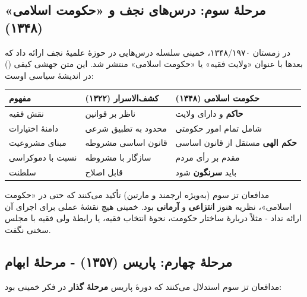 \documentclass[12pt,a4paper]{book}
\newcommand{\keyword}[1]{\textbf{\textcolor{cPrimary}{#1}}}
\newcommand{\en}[1]{\lr{\textit{#1}}}
\begin{document}
\subsection{مرحلهٔ سوم: درس‌های نجف و «حکومت اسلامی» (۱۳۴۸)}

در زمستان ۱۳۴۸/۱۹۷۰، خمینی سلسله درس‌هایی در حوزهٔ علمیهٔ نجف ارائه داد که بعدها با عنوان «ولایت فقیه» یا «حکومت اسلامی» منتشر شد. این متن جهشی کیفی (\en{qualitative leap}) در اندیشهٔ سیاسی اوست:

\begin{warningBox}
\begin{longtable}{%
    >{\raggedleft\arraybackslash}p{}
    >{\raggedleft\arraybackslash}p{}
    >{\raggedleft\arraybackslash}p{}}
\toprule
\rowcolor{cAccent!10}
\textbf{مفهوم} & \textbf{کشف‌الاسرار (۱۳۲۲)} & \textbf{حکومت اسلامی (۱۳۴۸)} \\
\midrule

نقش فقیه & ناظر بر قوانین & \keyword{حاکم} و دارای ولایت \\
\midrule
دامنهٔ اختیارات & محدود به تطبیق شرعی & شامل تمام امور حکومتی \\
\midrule
مبنای مشروعیت & قانون اساسی مشروطه & \keyword{حکم الهی} مستقل از قانون اساسی \\
\midrule
نسبت با دموکراسی & سازگار با مشروطه & مقدم بر رأی مردم \\
\midrule
سلطنت & قابل اصلاح & باید \keyword{سرنگون} شود \\

\bottomrule
\end{longtable}
\end{warningBox}

مدافعان تز سوم (به‌ویژه ارجمند و مارتین) تأکید می‌کنند که حتی در «حکومت اسلامی»، نظریه هنوز \keyword{انتزاعی} و \keyword{آرمانی} بود. خمینی هیچ نقشهٔ عملی برای اجرای آن ارائه نداد - مثلاً دربارهٔ ساختار حکومت، نحوهٔ انتخاب فقیه، یا رابطهٔ ولی فقیه با مجلس سخنی نگفت.

\subsection{مرحلهٔ چهارم: پاریس (۱۳۵۷) - مرحلهٔ ابهام}

مدافعان تز سوم استدلال می‌کنند که دورهٔ پاریس \keyword{مرحلهٔ گذار} در فکر خمینی بود:
\end{document}
